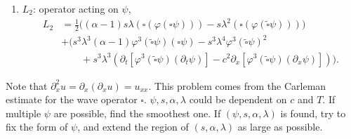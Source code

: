 \documentclass[11pt]{amsart}
\numberwithin{algorithm}{section}
\numberwithin{equation}{section}
\begin{document}
\begin{tcolorbox}[colback=blue!5, colframe=blue!70, title=Definitions and notations]
\begin{enumerate}
    \item $L_{2}$: operator acting on $\psi$,
    \begin{equation*}
    \begin{aligned}
        L_{2}
        &=
        \frac{1}{2}
        \Big (
            (\alpha - 1) s \lambda (\square (\varphi (\square \psi)))
            -
            s \lambda^{2} (\square (\varphi (\widetilde{\square} \psi)))
        \Big )\\
        &+
        \Big (
            s^{3} \lambda^{3} (\alpha - 1) \varphi^{3} (\widetilde{\square} \psi) (\square \psi)
            -
            s^{3} \lambda^{4} \varphi^{3} (\widetilde{\square} \psi)^{2}\\
            &\qquad+
            s^{3} \lambda^{3}
            \left (
                \partial_{t} [ \varphi^{3} (\widetilde{\square} \psi) (\partial_{t} \psi) ]
                -
                c^{2} \partial_{x} [ \varphi^{3} (\widetilde{\square} \psi) (\partial_{x} \psi) ]
            \right )
        \Big ).
    \end{aligned}
    \end{equation*}
\end{enumerate}
\end{tcolorbox}
Note that $\partial_{x}^{2} u = \partial_{x} (\partial_{x} u) = u_{x x}$.
This problem comes from the Carleman estimate for the wave operator $\square$.
$\psi, s, \alpha, \lambda$ could be dependent on $c$ and $T$.
If multiple $\psi$ are possible, find the smoothest one.
If $(\psi, s, \alpha, \lambda)$ is found, try to fix the form of $\psi$, and extend the region of $(s, \alpha, \lambda)$ as large as possible.
\end{document}

